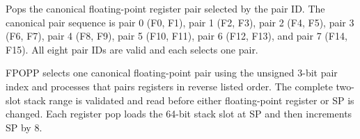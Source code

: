 Pops the canonical floating-point register pair selected by the pair ID. The canonical pair sequence is pair 0 (F0, F1), pair 1 (F2, F3), pair 2 (F4, F5), pair 3 (F6, F7), pair 4 (F8, F9), pair 5 (F10, F11), pair 6 (F12, F13), and pair 7 (F14, F15). All eight pair IDs are valid and each selects one pair.

FPOPP selects one canonical floating-point pair using the unsigned 3-bit pair index and processes that pair\textquotesingle{}s registers in reverse listed order. The complete two-slot stack range is validated and read before either floating-point register or SP is changed. Each register pop loads the 64-bit stack slot at SP and then increments SP by 8.

